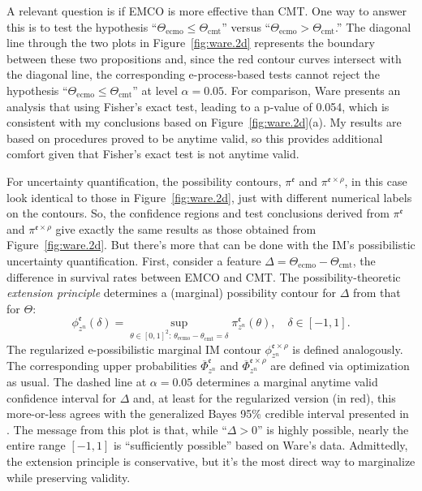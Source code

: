 \documentclass[a4paper, 12pt]{article}
\theoremstyle{plain}
\theoremstyle{definition}
\theoremstyle{remark}
\newcommand{\uPhi}{\overline{\Phi}}
\newcommand{\eval}{\mathfrak{e}}
\begin{document}
A relevant question is if EMCO is more effective than CMT.  One way to answer this is to test the hypothesis ``$\Theta_\text{ecmo} \leq \Theta_\text{cmt}$'' versus ``$\Theta_\text{ecmo} > \Theta_\text{cmt}$.'' The diagonal line through the two plots in Figure~\ref{fig:ware.2d} represents the boundary between these two propositions and, since the red contour curves intersect with the diagonal line, the corresponding e-process-based tests cannot reject the hypothesis ``$\Theta_\text{ecmo} \leq \Theta_\text{cmt}$'' at level $\alpha=0.05$.
For comparison, Ware presents an analysis that using Fisher's exact test, leading to a p-value of 0.054, which is consistent with my conclusions based on Figure~\ref{fig:ware.2d}(a).  My results are based on procedures proved to be anytime valid, so this provides additional comfort given that Fisher's exact test is not anytime valid.

For uncertainty quantification, the possibility contours, $\pi^\eval$ and $\pi^{\eval \times \rho}$, in this case look identical to those in Figure~\ref{fig:ware.2d}, just with different numerical labels on the contours.  So, the confidence regions and test conclusions derived from $\pi^\eval$ and $\pi^{\eval \times \rho}$ give exactly the same results as those obtained from Figure~\ref{fig:ware.2d}.  But there's more that can be done with the IM's possibilistic uncertainty quantification.  First, consider a feature $\Delta = \Theta_\text{ecmo} - \Theta_\text{cmt}$, the difference in survival rates between EMCO and CMT.  The possibility-theoretic {\em extension principle} 
determines a (marginal) possibility contour 
for $\Delta$ from that for $\Theta$:
\[ \phi_{z^n}^\eval(\delta) = \sup_{\theta \in [0,1]^2: \, \theta_\text{ecmo}-\theta_\text{cmt}=\delta} \pi_{z^n}^\eval(\theta), \quad \delta \in [-1,1]. \]
The regularized e-possibilistic marginal IM contour $\phi_{z^n}^{\eval \times \rho}$ is defined analogously. The corresponding upper probabilities $\uPhi_{z^n}^\eval$ and $\uPhi_{z^n}^{\eval \times \rho}$ are defined via optimization as usual.  The dashed line at $\alpha=0.05$ determines a marginal anytime valid confidence interval for $\Delta$ and, at least for the regularized version (in red), this more-or-less agrees with the generalized Bayes 95\% credible interval presented in \citet[][Fig.~1]{walley1996}.  The message from this plot is that, while ``$\Delta > 0$'' is highly possible, nearly the entire range $[-1,1]$ is ``sufficiently possible'' based on Ware's data.  Admittedly, the extension principle is conservative, but it's the most direct way to marginalize while preserving validity.
\end{document}
